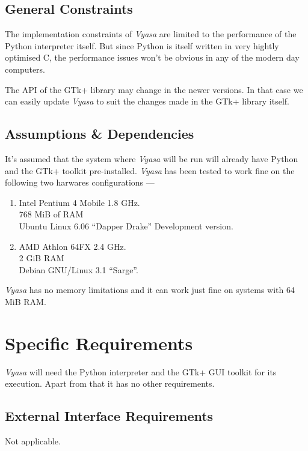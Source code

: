 \documentclass[12pt,a4paper]{article}
\newcommand{\VS}{\textit{Vyasa}}
\begin{document}
\subsection{General Constraints}
The implementation constraints of \VS{} are limited to the performance
of the Python interpreter itself. But since Python is itself written in
very hightly optimised C, the performance issues won't be obvious in any
of the modern day computers.

The API of the GTk+ library may change in the newer versions. In that
case we can easily update \VS{} to suit the changes made in the GTk+
library itself.

\subsection{Assumptions \&{} Dependencies}
It's assumed that the system where \VS{} will be run will already have
Python and the GTk+ toolkit pre-installed.
\VS{} has been tested to work fine on the following two harwares
configurations ---
\begin{enumerate}
\item Intel Pentium 4 Mobile 1.8 GHz.\\768 MiB of RAM\\Ubuntu Linux 6.06 ``Dapper Drake'' Development version.
\item AMD Athlon 64FX 2.4 GHz.\\2 GiB RAM\\Debian GNU/Linux 3.1 ``Sarge''.
\end{enumerate}
\VS{} has no memory limitations and it can work just fine on systems
with 64 MiB RAM.

\section{Specific Requirements}
\VS{} will need the Python interpreter and the GTk+ GUI toolkit for its
execution. Apart from that it has no other requirements.

\subsection{External Interface Requirements}
Not applicable.
\end{document}
